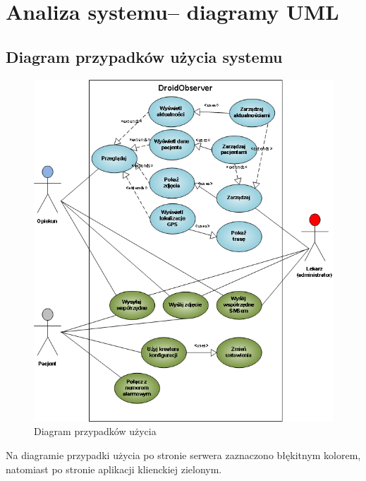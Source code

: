 \documentclass[11pt,a4paper]{article}
\begin{document}
\section {Analiza systemu– diagramy UML}
\subsection {Diagram przypadków użycia systemu}
\begin{figure}[h]
    \includegraphics[scale=0.66]{use_case.png}
    \caption{Diagram przypadków użycia}
 \end{figure}
Na diagramie przypadki użycia po stronie serwera zaznaczono błękitnym kolorem, natomiast po stronie aplikacji klienckiej zielonym.

\newpage
\end{document}

